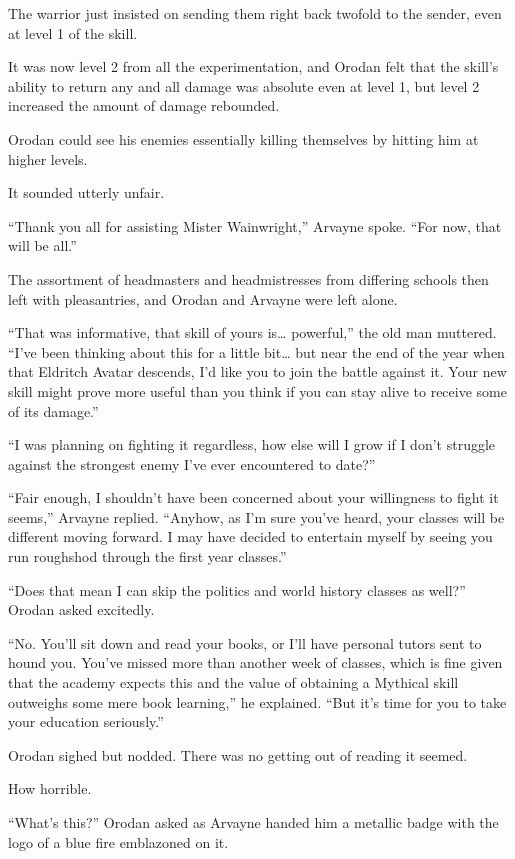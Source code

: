 \documentclass[a4paper,10pt]{book}
\begin{document}
The warrior just insisted on sending them right back twofold to the sender, even at level 1 of the skill.\par
It was now level 2 from all the experimentation, and Orodan felt that the skill’s ability to return any and all damage was absolute even at level 1, but level 2 increased the amount of damage rebounded.\par
Orodan could see his enemies essentially killing themselves by hitting him at higher levels.\par
It sounded utterly unfair.\par
“Thank you all for assisting Mister Wainwright,” Arvayne spoke. “For now, that will be all.”\par
The assortment of headmasters and headmistresses from differing schools then left with pleasantries, and Orodan and Arvayne were left alone.\par
“That was informative, that skill of yours is… powerful,” the old man muttered. “I’ve been thinking about this for a little bit… but near the end of the year when that Eldritch Avatar descends, I’d like you to join the battle against it. Your new skill might prove more useful than you think if you can stay alive to receive some of its damage.”\par
“I was planning on fighting it regardless, how else will I grow if I don’t struggle against the strongest enemy I’ve ever encountered to date?”\par
“Fair enough, I shouldn’t have been concerned about your willingness to fight it seems,” Arvayne replied. “Anyhow, as I’m sure you’ve heard, your classes will be different moving forward. I may have decided to entertain myself by seeing you run roughshod through the first year classes.”\par
“Does that mean I can skip the politics and world history classes as well?” Orodan asked excitedly.\par
“No. You’ll sit down and read your books, or I’ll have personal tutors sent to hound you. You’ve missed more than another week of classes, which is fine given that the academy expects this and the value of obtaining a Mythical skill outweighs some mere book learning,” he explained. “But it’s time for you to take your education seriously.”\par
Orodan sighed but nodded. There was no getting out of reading it seemed.\par
How horrible.\par
“What’s this?” Orodan asked as Arvayne handed him a metallic badge with the logo of a blue fire emblazoned on it.\par
\end{document}
